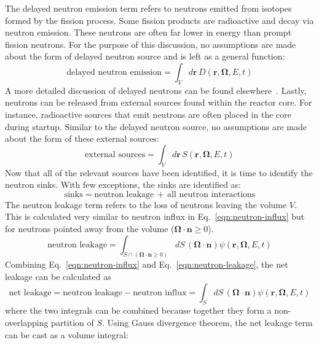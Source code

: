 The delayed neutron emission term refers to neutrons emitted from isotopes formed by the fission process. Some fission products are radioactive and decay via neutron emission. These neutrons are often far lower in energy than prompt fission neutrons. For the purpose of this discussion, no assumptions are made about the form of delayed neutron source and is left as a general function:
\begin{equation}
\text{delayed neutron emission} = \int_V d\mathbf{r} \, D(\mathbf{r}, \mathbf{\Omega}, E, t)
\end{equation}
A more detailed discussion of delayed neutrons can be found elsewhere~\cite{duderstadt, hebert2009applied}. Lastly, neutrons can be released from external sources found within the reactor core. For instance, radioactive sources that emit neutrons are often placed in the core during startup. Similar to the delayed neutron source, no assumptions are made about the form of these external sources:
\begin{equation}
\text{external sources} = \int_V d\mathbf{r} \, S(\mathbf{r}, \mathbf{\Omega}, E, t)
\end{equation}
Now that all of the relevant sources have been identified, it is time to identify the neutron sinks. With few exceptions, the sinks are identified as:
\begin{equation}
\text{sinks} = \text{neutron leakage} \, + \, \text{all neutron interactions}
\end{equation}
The neutron leakage term refers to the loss of neutrons leaving the volume $V$. This is calculated very similar to neutron influx in Eq.~\ref{eqn:neutron-influx} but for neutrons pointed away from the volume ($\mathbf{\Omega} \cdot \mathbf{n} \geq 0$).
\begin{equation}
\text{neutron leakage} = \int_{S \cap \left(\mathbf{\Omega} \cdot \mathbf{n} \geq 0 \right)} dS \, \left(\mathbf{\Omega} \cdot \mathbf{n} \right) \psi(\mathbf{r}, \mathbf{\Omega}, E, t)
\label{eqn:neutron-leakage}
\end{equation}
Combining Eq.~\ref{eqn:neutron-influx} and Eq.~\ref{eqn:neutron-leakage}, the net leakage can be calculated as
\begin{equation}
\text{net leakage} = \text{neutron leakage} - \text{neutron influx} = \int_{S} dS \, \left(\mathbf{\Omega} \cdot \mathbf{n} \right) \psi(\mathbf{r}, \mathbf{\Omega}, E, t)
\label{eqn:net-leakage-surf}
\end{equation}
where the two integrals can be combined because together they form a non-overlapping partition of $S$. Using Gauss divergence theorem, the net leakage term can be cast as a volume integral:
